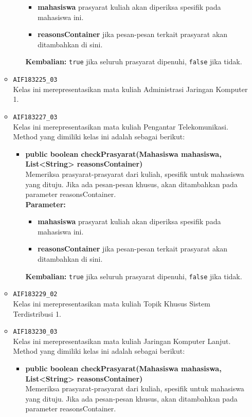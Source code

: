 \begin{enumerate}
\begin{itemize}
\begin{itemize}
\begin{itemize}
				\item \textbf{mahasiswa} prasyarat kuliah akan diperiksa spesifik pada mahasiswa ini.
				\item \textbf{reasonsContainer} jika pesan-pesan terkait prasyarat akan ditambahkan di sini.
			\end{itemize}
			\textbf{Kembalian:} \texttt{true} jika seluruh prasyarat dipenuhi, \texttt{false} jika tidak.
		\end{itemize}
		\item \texttt{AIF183225\_03} \\
		Kelas ini merepresentasikan mata kuliah Administrasi Jaringan Komputer 1.
		\item \texttt{AIF183227\_03} \\
		Kelas ini merepresentasikan mata kuliah Pengantar Telekomunikasi. Method yang dimiliki kelas ini adalah sebagai berikut: 
		\begin{itemize}
			\item \textbf{public boolean checkPrasyarat(Mahasiswa mahasiswa, List<String> reasonsContainer)}\\
			Memeriksa prasyarat-prasyarat dari kuliah, spesifik untuk mahasiswa yang dituju. Jika ada pesan-pesan khusus, akan ditambahkan pada parameter reasonsContainer.\\
			\textbf{Parameter:}
			\begin{itemize}
				\item \textbf{mahasiswa} prasyarat kuliah akan diperiksa spesifik pada mahasiswa ini.
				\item \textbf{reasonsContainer} jika pesan-pesan terkait prasyarat akan ditambahkan di sini.
			\end{itemize}
			\textbf{Kembalian:} \texttt{true} jika seluruh prasyarat dipenuhi, \texttt{false} jika tidak.
		\end{itemize}
		\item \texttt{AIF183229\_02} \\
		Kelas ini merepresentasikan mata kuliah Topik Khusus Sistem Terdistribusi 1.
		\item \texttt{AIF183230\_03} \\
		Kelas ini merepresentasikan mata kuliah Jaringan Komputer Lanjut. Method yang dimiliki kelas ini adalah sebagai berikut: 
		\begin{itemize}
			\item \textbf{public boolean checkPrasyarat(Mahasiswa mahasiswa, List<String> reasonsContainer)}\\
			Memeriksa prasyarat-prasyarat dari kuliah, spesifik untuk mahasiswa yang dituju. Jika ada pesan-pesan khusus, akan ditambahkan pada parameter reasonsContainer.\\

\end{itemize}
\end{itemize}
\end{enumerate}
